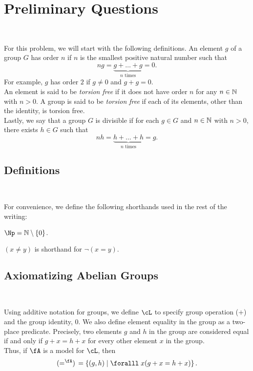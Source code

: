 \section{Preliminary Questions}~\label{sec:prelims}

For this problem, we will start with the following definitions.
An element $g$ of a group $G$ has order $n$ if $n$ is the smallest
positive natural number such that
\[ n g = \underbrace{g + \ldots + g}_{\text{$n$ times}} = 0. \]
For example, $g$ has order $2$ if $g \neq 0$ and $g + g = 0$. \\
An element is said to be \emph{torsion free} if it does not have order $n$
for any $n \in \mathbb{N}$ with $n > 0$. A group is said to be \emph{torsion free}
if each of its elements, other than the identity, is torsion free. \\
Lastly, we say that a group $G$ is divisible if for each $g \in G$
and $n \in \mathbb{N}$ with $n > 0$, there exists $h \in G$ such that
\[ nh = \underbrace{h + \ldots + h}_{\text{$n$ times}} = g. \]

\subsection{Definitions}~\label{sec:definitions}

For convenience, we define the following shorthands used in the rest of the writing:
\begin{enumroman}
  \item $\Np = \N \setminus \{0\}$.
  \item $(x \neq y)$ is shorthand for $\lnot (x = y)$.
\end{enumroman}

\subsection{Axiomatizing Abelian Groups}~\label{sec:axiomatizing-abelian-groups}


Using additive notation for groups, we define $\cL$ to specify
group operation ($+$) and the group identity, $0$.
We also define element equality in the group as a two-place predicate.
Precisely, two elements $g$ and $h$ in the group are considered equal
if and only if $g + x = h + x$ for every other element $x$ in the group. \\
Thus, if $\fA$ is a model for $\cL$, then
\[
  (=^\fA) \, = \set{ (g, h) \mid \forall x (g + x = h + x)}.
\]


